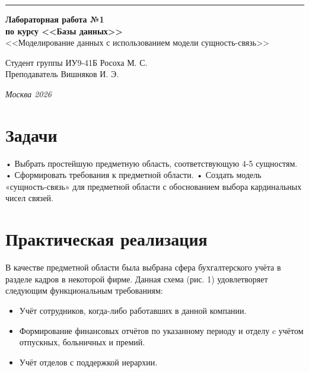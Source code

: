 \documentclass[a4paper, 14pt]{extarticle}
\begin{document}
\begin{titlepage}
\vspace*{-16pt}
\hspace{30pt}\rule{0.866\textwidth}{0.4pt}
  
\vspace{11em}

\begin{center}
\Large {\bf Лабораторная работа №1} \\ 
\large {\bf по курсу <<Базы данных>>} \\ 
\large <<Моделирование данных с использованием модели сущность-связь>>
\end{center}\normalsize

\vspace{8em}


\begin{flushright}
  {Студент группы ИУ9-41Б Росоха М. С.\hspace*{15pt} \\
  \vspace{2ex}
  Преподаватель Вишняков И. Э.\hspace*{15pt}}
\end{flushright}

\bigskip

\vfill
 

\begin{center}
\textsl{Москва 2026}
\end{center}
\end{titlepage}

\renewcommand{\ttdefault}{pcr}

\setlength{\tabcolsep}{3pt}
\newpage
\setcounter{page}{2}
\section{Задачи}\label{Sect::task}
\indent • Выбрать простейшую предметную область, соответствующую 4-5 сущностям. \newline
\indent • Сформировать требования к предметной области. \newline
\indent • Создать модель «сущность-связь» для предметной области с обоснованием выбора кардинальных чисел связей.
\section{Практическая реализация}
В качестве предметной области была выбрана сфера бухгалтерского учёта в разделе кадров в некоторой фирме. Данная схема (рис. 1) удовлетворяет следующим функциональным требованиям:
\begin{itemize}
    \item Учёт сотрудников, когда-либо работавших в данной компании.
    \item Формирование финансовых отчётов по указанному периоду и отделу c учётом отпускных, больничных и премий.
    \item Учёт отделов с поддержкой иерархии.
\end{itemize}
\end{document}
